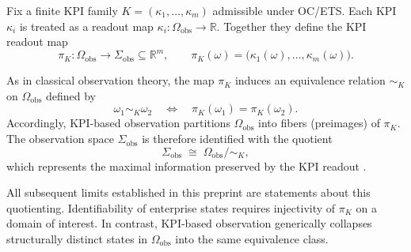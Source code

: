 Fix a finite KPI family \(K=(\kappa_1,\ldots,\kappa_m)\) admissible under OC/ETS.
Each KPI \(\kappa_i\) is treated as a readout map
\(\kappa_i:\Omega_{\mathrm{obs}}\to\mathbb{R}\).
Together they define the KPI readout map
\[
\pi_K:\Omega_{\mathrm{obs}}\to\Sigma_{\mathrm{obs}}\subseteq\mathbb{R}^m,
\qquad
\pi_K(\omega)
=
\bigl(\kappa_1(\omega),\ldots,\kappa_m(\omega)\bigr).
\]

As in classical observation theory, the map \(\pi_K\) induces an equivalence
relation \(\sim_K\) on \(\Omega_{\mathrm{obs}}\) defined by
\[
\omega_1 \sim_K \omega_2
\quad\Longleftrightarrow\quad
\pi_K(\omega_1)=\pi_K(\omega_2).
\]
Accordingly, KPI-based observation partitions \(\Omega_{\mathrm{obs}}\) into
fibers (preimages) of \(\pi_K\).
The observation space \(\Sigma_{\mathrm{obs}}\) is therefore identified with the
quotient
\[
\Sigma_{\mathrm{obs}} \;\cong\; \Omega_{\mathrm{obs}} / \!\sim_K ,
\]
which represents the maximal information preserved by the KPI readout
\cite{kalman1960,ljung1999}.

All subsequent limits established in this preprint are statements about this
quotienting.
Identifiability of enterprise states requires injectivity of \(\pi_K\) on a
domain of interest.
In contrast, KPI-based observation generically collapses structurally distinct
states in \(\Omega_{\mathrm{obs}}\) into the same equivalence class.
